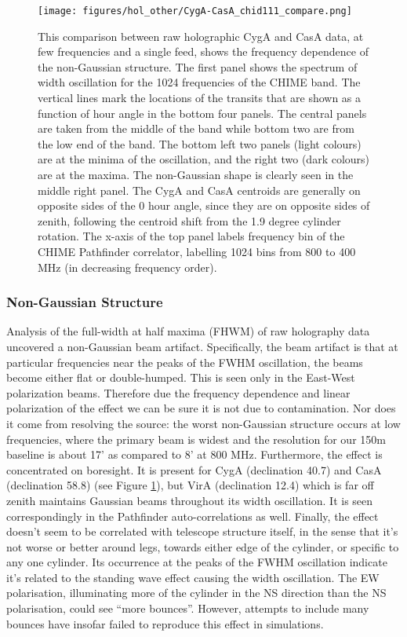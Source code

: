 \begin{figure}[t]
\texttt{[image: figures/hol\_other/CygA-CasA\_chid111\_compare.png]}
\caption{This comparison between raw holographic CygA and CasA data, at few frequencies and a single feed, shows the frequency dependence of the non-Gaussian structure. The first panel shows the spectrum of width oscillation for the 1024 frequencies of the CHIME band. The vertical lines mark the locations of the transits that are shown as a function of hour angle in the bottom four panels. The central panels are taken from the middle of the band while bottom two are from the low end of the band. The bottom left two panels (light colours) are at the minima of the oscillation, and the right two (dark colours) are at the maxima. The non-Gaussian shape is clearly seen in the middle right panel. The CygA and CasA centroids are generally on opposite sides of the 0 hour angle, since they are on opposite sides of zenith, following the centroid shift from the 1.9 degree cylinder rotation. The x-axis of the top panel labels frequency bin of the CHIME Pathfinder correlator, labelling 1024 bins from 800 to 400 MHz (in decreasing frequency order).}
\label{cygacasa}
\end{figure} 

\subsubsection{Non-Gaussian Structure}

Analysis of the full-width at half maxima (FHWM) of raw holography data uncovered a non-Gaussian beam artifact. Specifically, the beam artifact is that at particular frequencies near the peaks of the FWHM oscillation, the beams become either flat or double-humped. This is seen only in the East-West polarization beams. Therefore due the frequency dependence and linear polarization of the effect we can be sure it is not due to contamination. Nor does it come from resolving the source: the worst non-Gaussian structure occurs at low frequencies, where the primary beam is widest and the resolution for our 150m baseline is about 17' as compared to 8' at 800 MHz. Furthermore, the effect  is concentrated on boresight. It is present for CygA (declination 40.7) and CasA (declination 58.8) (see Figure \ref{cygacasa}), but VirA (declination 12.4) which is far off zenith maintains Gaussian beams throughout its width oscillation. It is seen correspondingly in the Pathfinder auto-correlations as well. Finally, the effect doesn't seem to be correlated with telescope structure itself, in the sense that it's not worse or better around legs, towards either edge of the cylinder, or specific to any one cylinder. Its occurrence at the peaks of the FWHM oscillation indicate it's related to the standing wave effect causing the width oscillation. The EW polarisation, illuminating more of the cylinder in the NS direction than the NS polarisation, could see ``more bounces''. However, attempts to include many bounces have insofar failed to reproduce this effect in simulations.


